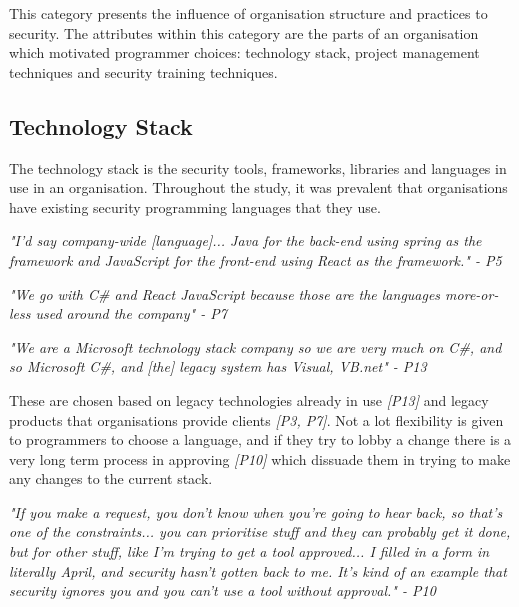 This category presents the influence of organisation structure and practices to security. The attributes within this category are the parts of an organisation which motivated programmer choices: technology stack, project management techniques and security training techniques. 

\subsection{Technology Stack}

\par The technology stack is the security tools, frameworks, libraries and languages in use in an organisation. Throughout the study, it was prevalent that organisations have existing security programming languages that they use. 
\newline
\par
\textit{"I'd say company-wide [language]... Java for the back-end using spring as the framework and JavaScript for the front-end using React as the framework." - P5}
\newline
\par
\textit{"We go with C\# and React JavaScript because those are the languages more-or-less used around the company" - P7}
\newline
\par
\textit{"We are a Microsoft technology stack company so we are very much on C\#, and so Microsoft C\#, and [the] legacy system has Visual, VB.net" - P13}
\newline
\par
These are chosen based on legacy technologies already in use \textit{[P13]} and legacy products that organisations provide clients \textit{[P3, P7]}.  Not a lot flexibility is given to programmers to choose a language, and if they try to lobby a change there is a very long term process in approving \textit{[P10]} which dissuade them in trying to make any changes to the current stack.
\newline
\par 
\textit{"If you make a request, you don't know when you're going to hear back, so that's one of the constraints... you can prioritise stuff and they can probably get it done, but for other stuff, like I'm trying to get a tool approved... I filled in a form in literally April, and security hasn't gotten back to me. It's kind of an example that security ignores you and you can't use a tool without approval." - P10}
\newline
\par
